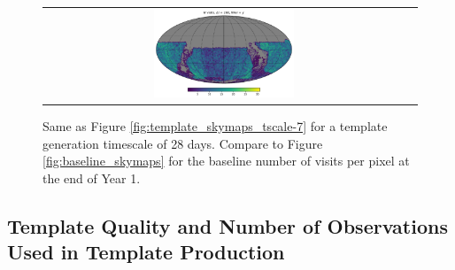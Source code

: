 \documentclass[preprintm,linenumbers]{aastex631}
\begin{document}
\begin{figure}
\begin{tabular}{c c}
				\includegraphics[width=0.4\textwidth]{results/skymaps/skymap_first_year_one_snap_v4_0_10yrs_db_noDD_noTwi_tscale-28_nside-256_doAllTemplateMetrics_reduceCount_y_noDD_noTwi.pdf} \\
			\end{tabular}
			\caption{Same as Figure \ref{fig:template_skymaps_tscale-7} for a template generation timescale of 28 days.
				Compare to Figure \ref{fig:baseline_skymaps} for the baseline number of visits per pixel at the end of Year 1.
			}
			\label{fig:template_skymaps_tscale-28}
		\end{figure}

  


		\subsection{Template Quality and Number of Observations Used in Template Production}
		
\end{document}
